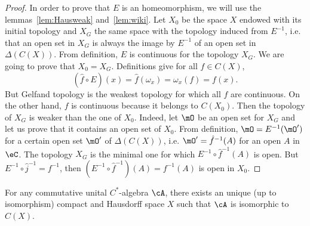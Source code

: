 \begin{proof}
In order to prove that $E$ is an homeomorphism, we will use the lemmas~\ref{lem:Hausweak} and~\ref{lem:wiki}. Let $X_0$ be the space $X$ endowed with its initial topology and $X_G$ the same space with the topology induced from $E^{-1}$, i.e. that an open set in $X_G$ is always the image by $E^{-1}$ of an open set in $\Delta(C(X))$. From definition, $E$ is continuous for the topology $X_G$. We are going to prove that $X_0=X_G$. Definitions give for all $f\in C(X)$,
\[
 (\hat f\circ E)(x)=\hat f(\omega_x)=\omega_x(f)=f(x).
\]
But Gelfand topology is the weakest topology for which all $f$ are continuous. On the other hand, $f$ is continuous because it belongs to $C(X_0)$. Then the topology of $X_G$ is weaker than the one of $X_0$. Indeed, let $\mO$ be an open set for $X_G$ and let us prove that it contains an open set of $X_0$. From definition, $\mO=E^{-1}(\mO')$ for a certain open set $\mO'$ of $\Delta(C(X))$, i.e. $\mO'=\hat f^{-1}(A)$ for an open $A$ in $\eC$. The topology $X_G$ is the minimal one for which $E^{-1}\circ\hat f^{-1}(A)$ is open. But $E^{-1}\circ\hat j^{-1}=f^{-1}$, then $(E^{-1}\circ\hat f^{-1})(A)=f^{-1}(A)$ is open in $X_0$.
\end{proof}


\begin{theorem}    

For any commutative unital $C^*$-algebra $\cA$, there exists an unique (up to isomorphism) compact and Hausdorff space $X$ such that  $\cA$ is isomorphic to $C(X)$.
\label{thoGelfand}
\end{theorem}

